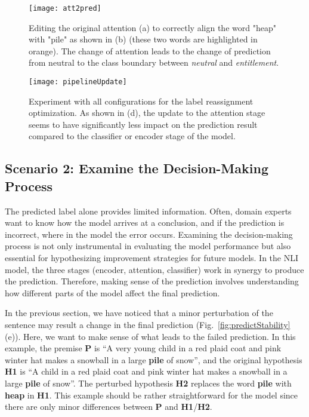 \begin{figure}[htbp]
\centering
\vspace{-2mm}
 \texttt{[image: att2pred]}
 \vspace{-6mm}
 \caption{
Editing the original attention (a) to correctly align the word "heap" with "pile" as shown in (b) (these two words are highlighted in orange).
The change of attention leads to the change of prediction from neutral to the class boundary between \emph{neutral} and \emph{entitlement}.
%
}
\label{fig:att2pred}
\end{figure}

\begin{figure*}[t]
\centering
\vspace{-2mm}
 \texttt{[image: pipelineUpdate]}
  \vspace{-6mm}
 \caption{
Experiment with all configurations for the label reassignment optimization. As shown in (d), the update to the attention stage seems to have significantly less impact on the prediction result compared to the classifier or encoder stage of the model.
 }
  \vspace{-4mm}
\label{fig:pipelineUpdate}
\end{figure*}

\subsection{Scenario 2: Examine the Decision-Making Process}
The predicted label alone provides limited information. Often, domain experts want to know how the model arrives at a conclusion, and if the prediction is incorrect, where in the model the error occurs.
Examining the decision-making process is not only instrumental in evaluating the model performance but also essential for hypothesizing improvement strategies for future models.
%
In the NLI model, the three stages (encoder, attention, classifier) work in synergy to produce the prediction.
Therefore, making sense of the prediction involves understanding how different parts of the model affect the final prediction.

In the previous section, we have noticed that a minor perturbation of the sentence may result a change in the final prediction (Fig.~\ref{fig:predictStability}(e)). Here, we want to make sense of what leads to the failed prediction. In this example, the premise \textbf{P} is ``A very young child in a red plaid coat and pink winter hat makes a snowball in a large \textbf{pile} of snow'', and the original hypothesis \textbf{H1} is ``A child in a red plaid coat and pink winter hat makes a snowball in a large \textbf{pile} of snow''. The perturbed hypothesis \textbf{H2} replaces the word \textbf{pile} with \textbf{heap} in \textbf{H1}. This example should be rather straightforward for the model since there are only minor differences between \textbf{P} and \textbf{H1}/\textbf{H2}.

